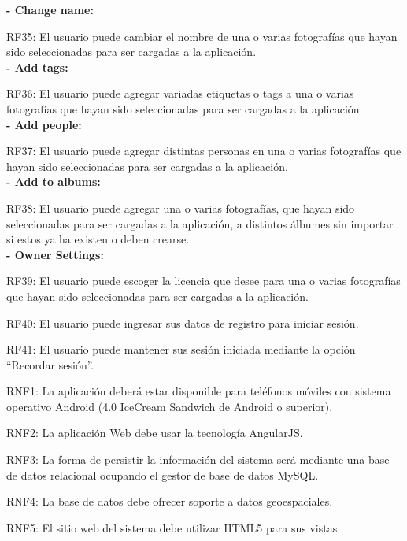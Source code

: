 \documentclass{memoria}
\begin{document}
\textbf{- Change name:}

RF35: El usuario puede cambiar el nombre de una o varias fotografías que hayan sido seleccionadas para ser cargadas a la aplicación.\\

\textbf{- Add tags:}

RF36: El usuario puede agregar variadas etiquetas o tags a una o varias fotografías que hayan sido seleccionadas para ser cargadas a la aplicación.\\

\textbf{- Add people:}

RF37: El usuario puede agregar distintas personas en una o varias fotografías que hayan sido seleccionadas para ser cargadas a la aplicación.\\

\textbf{- Add to albums:}

RF38: El usuario puede agregar una o varias fotografías, que hayan sido seleccionadas para ser cargadas a la aplicación, a distintos álbumes sin importar si estos ya ha existen o deben crearse.\\

\textbf{- Owner Settings:}

RF39: El usuario puede escoger la licencia que desee para una o varias fotografías que hayan sido seleccionadas para ser cargadas a la aplicación.\\


RF40: El usuario puede ingresar sus datos de registro para iniciar sesión.

RF41: El usuario puede mantener sus sesión iniciada mediante la opción “Recordar sesión”.\\

\newpage


RNF1: La aplicación deberá estar disponible para teléfonos móviles con sistema operativo Android (4.0 IceCream Sandwich de Android o superior).

RNF2: La aplicación Web debe usar la tecnología AngularJS.

RNF3: La forma de persistir la información del sistema será mediante una base de datos relacional ocupando el gestor de base de datos MySQL.

RNF4: La base de datos debe ofrecer soporte a datos geoespaciales.

RNF5: El sitio web del sistema debe utilizar HTML5 para sus vistas.
\end{document}
